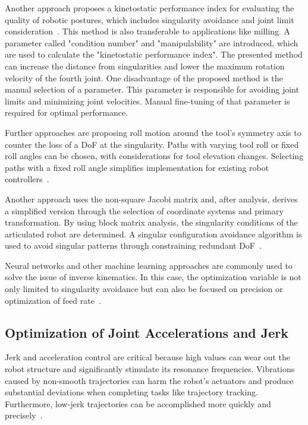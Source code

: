 Another approach proposes a kinetostatic performance index for evaluating the quality of robotic postures, which includes singularity avoidance and joint limit consideration~\cite{Huo.2008}. This method is also transferable to applications like milling. A parameter called "condition number" and "manipulability" are introduced, which are used to calculate the "kinetostatic performance index". The presented method can increase the distance from singularities and lower the maximum rotation velocity of the fourth joint. One disadvantage of the proposed method is the manual selection of a parameter. This parameter is responsible for avoiding joint limits and minimizing joint velocities. Manual fine-tuning of that parameter is required for optimal performance. 

Further approaches are proposing roll motion around the tool's symmetry axis to counter the loss of a \acrshort{DoF} at the singularity. Paths with varying tool roll or fixed roll angles can be chosen, with considerations for tool elevation changes. Selecting paths with a fixed roll angle simplifies implementation for existing robot controllers~\cite{Milenkovic.2021}.

Another approach uses the non-square Jacobi matrix and, after analysis, derives a simplified version through the selection of coordinate systems and primary transformation. By using block matrix analysis, the singularity conditions of the articulated robot are determined.
A singular configuration avoidance algorithm is used to avoid singular patterns through constraining redundant \acrshort{DoF}~\cite{Shi.2021}.

Neural networks and other machine learning approaches are commonly used to solve the issue of inverse kinematics. In this case, the optimization variable is not only limited to singularity avoidance but can also be focused on precision or optimization of feed rate~\cite{Wei.2014}.

\subsection{Optimization of Joint Accelerations and Jerk}

Jerk and acceleration control are critical because high values can wear out the robot structure and significantly stimulate its resonance frequencies. Vibrations caused by non-smooth trajectories can harm the robot's actuators and produce substantial deviations when completing tasks like trajectory tracking. Furthermore, low-jerk trajectories can be accomplished more quickly and precisely~\cite{Gasparetto.2010}.

